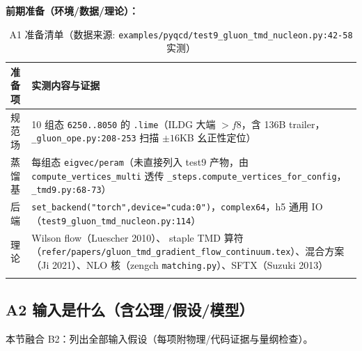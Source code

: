 \documentclass[UTF8]{ctexart}
\begin{document}
\textbf{前期准备（环境/数据/理论）：}
\small
\begin{xltabular}{\textwidth}{lX}
\toprule
准备项 & 实测内容与证据 \\
\midrule
\endhead
规范场 & 10 组态 \texttt{\nolinkurl{6250..8050}} 的 \texttt{\nolinkurl{.lime}}（ILDG 大端 $>f8$，含 136B trailer，\texttt{\nolinkurl{\_gluon\_ope.py:208-253}} 扫描 $ \pm16$KB 幺正性定位） \\
蒸馏基 & 每组态 \texttt{\nolinkurl{eigvec/peram}}（未直接列入 test9 产物，由 \texttt{\nolinkurl{compute\_vertices\_multi}} 透传 \texttt{\nolinkurl{\_steps.compute\_vertices\_for\_config}}，\texttt{\nolinkurl{\_tmd9.py:68-73}}） \\
后端 & \texttt{\nolinkurl{set\_backend("torch",device="cuda:0")}}，\texttt{\nolinkurl{complex64}}，h5 通用 IO（\texttt{\nolinkurl{test9\_gluon\_tmd\_nucleon.py:114}}） \\
理论 & Wilson flow（Luescher 2010）、 staple TMD 算符（\texttt{\nolinkurl{refer/papers/gluon\_tmd\_gradient\_flow\_continuum.tex}}）、混合方案（Ji 2021）、NLO 核（zengch \texttt{\nolinkurl{matching.py}}）、SFTX（Suzuki 2013） \\
\bottomrule
\caption{A1 准备清单（数据来源: \texttt{\nolinkurl{examples/pyqcd/test9\_gluon\_tmd\_nucleon.py:42-58}} 实测）}
\end{xltabular}

\subsection{A2 输入是什么（含公理/假设/模型）}
\label{sec:a2}
本节融合 B2：列出全部输入假设（每项附物理/代码证据与量纲检查）。
\end{document}
